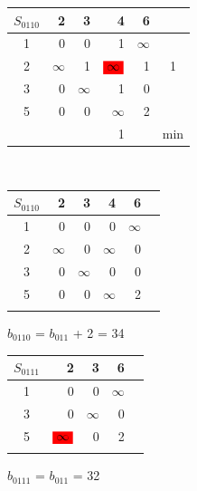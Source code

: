 \documentclass[12pt]{article}
\begin{document}
\begin{flushleft}
\begin{tabular}{c||rrrr||c}
$S_{0110}$  &2 & 3 & 4 & 6 & \\
\hline
\hline
1 &  0        & 0        & 1                           & $\infty$ & \\
2 &  $\infty$ & 1        & $\colorbox{red}{$\infty$}$  & 1 & 1\\
3 &  0        & $\infty$ & 1                           & 0 & \\
5 &  0        & 0        & $\infty$                    & 2 & \\
\hline
\hline
 &  &  & 1 && min \\
\end{tabular}
$\qquad $ 
\begin{tabular}{c||rrrr||c}
$S_{0110}$  &2 & 3 & 4 & 6 & \\
\hline
\hline
1 &  0        & 0        & 0                           & $\infty$ & \\
2 &  $\infty$ & 0        & $\infty$  & 0 & \\
3 &  0        & $\infty$ & 0                           & 0 & \\
5 &  0        & 0        & $\infty$                    & 2 & \\
\hline
\hline
 &  &  &  & \\
\end{tabular}
\end{flushleft}

$b_{0110}$ = $b_{011}$ + 2 = 34\\

\begin{flushleft}
\begin{tabular}{c||rrr||c}
$S_{0111}$  &2 & 3 &  6 & \\
\hline
\hline
1 &  0        & 0           & $\infty$ & \\
3 &  0        & $\infty$    & 0 & \\
5 &  $\colorbox{red}{$\infty$}$        & 0           & 2 & \\
\hline
\hline
 &    &  & &  \\
\end{tabular}
\end{flushleft}
$b_{0111}$ = $b_{011}$ = 32\\
\end{document}
